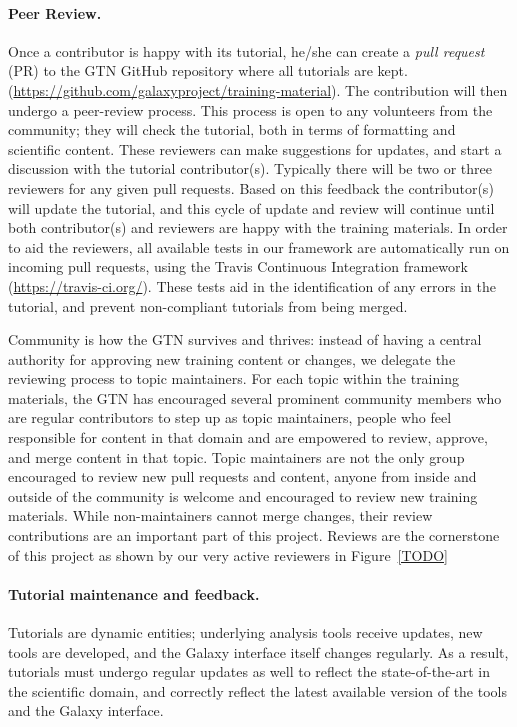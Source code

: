 \documentclass[10pt,letterpaper]{article}
\begin{document}
\paragraph*{Peer Review.} Once a contributor is happy with its tutorial, he/she can create a \emph{pull request} (PR) to the GTN GitHub repository where all tutorials are kept.  (\url{https://github.com/galaxyproject/training-material}).
The contribution will then undergo a peer-review process.
This process is open to any volunteers from the community; they will check the tutorial, both in terms of formatting and scientific content.
These reviewers can make suggestions for updates, and start a discussion with the tutorial contributor(s).
Typically there will be two or three reviewers for any given pull requests.
Based on this feedback the contributor(s) will update the tutorial, and this cycle of update and review will continue until both contributor(s) and reviewers are happy with the training materials.
In order to aid the reviewers, all available tests in our framework are automatically run on incoming pull requests, using the Travis Continuous Integration framework (\url{https://travis-ci.org/}). %
These tests aid in the identification of any errors in the tutorial, and prevent non-compliant tutorials from being merged.

Community is how the GTN survives and thrives: instead of having a central authority for approving new training content or changes, we delegate the reviewing process to topic maintainers.
For each topic within the training materials, the GTN has encouraged several prominent community members who are regular contributors to step up as topic maintainers, people who feel responsible for content in that domain and are empowered to review, approve, and merge content in that topic.
Topic maintainers are not the only group encouraged to review new pull requests and content, anyone from inside and outside of the community is welcome and encouraged to review new training materials.
While non-maintainers cannot merge changes, their review contributions are an important part of this project.
Reviews are the cornerstone of this project as shown by our very active reviewers in Figure~\ref{TODO}




\paragraph*{Tutorial maintenance and feedback.} Tutorials are dynamic entities; underlying analysis tools receive updates, new tools are developed, and the Galaxy interface itself changes regularly.
As a result, tutorials must undergo regular updates as well to reflect the state-of-the-art in the scientific domain, and correctly reflect the latest available version of the tools and the Galaxy interface.
\end{document}
